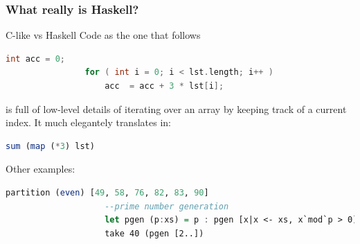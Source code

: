 		\begin{frame}[fragile]\frametitle{What really is Haskell?}
			\begin{exampleblock}{C-like vs Haskell}
			Code as the one that follows
			\begin{lstlisting}[language=C++]
				int acc = 0;
				for ( int i = 0; i < lst.length; i++ )
 					acc	 = acc + 3 * lst[i];
			\end{lstlisting}
			is full of low-level details of iterating over an array by
			keeping track of a current index. It much elegantely translates in:
			\begin{lstlisting}[language=Haskell]
					sum (map (*3) lst)
			\end{lstlisting}
			\end{exampleblock}
			Other examples:
			\begin{lstlisting}[language=Haskell,xleftmargin=-1.5em]
					partition (even) [49, 58, 76, 82, 83, 90]
					--prime number generation
					let pgen (p:xs) = p : pgen [x|x <- xs, x`mod`p > 0]
					take 40 (pgen [2..])
				\end{lstlisting}
	\end{frame}
	